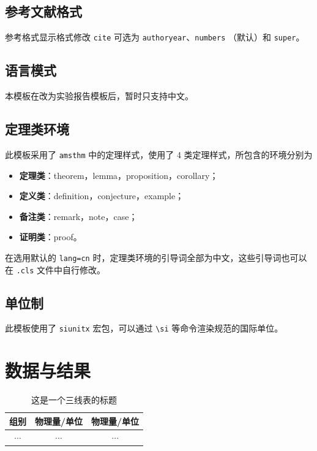 \documentclass[cn,hazy,pku,12pt,normal,math=newtx,cite=super]{elegantnote}
\begin{document}
\subsection{参考文献格式}
参考格式显示格式修改 \lstinline{cite} 可选为 \lstinline{authoryear}、\lstinline{numbers} （默认）和 \lstinline{super}。

\subsection{语言模式}

本模板在改为实验报告模板后，暂时只支持中文。


\subsection{定理类环境}

此模板采用了 \lstinline{amsthm} 中的定理样式，使用了 4 类定理样式，所包含的环境分别为
\begin{itemize}
  \item \textbf{定理类}：theorem，lemma，proposition，corollary；
  \item \textbf{定义类}：definition，conjecture，example；
  \item \textbf{备注类}：remark，note，case；
  \item \textbf{证明类}：proof。
\end{itemize}

\begin{remark}
在选用默认的 \lstinline{lang=cn} 时，定理类环境的引导词全部为中文，这些引导词也可以在 \lstinline{.cls} 文件中自行修改。
\end{remark}

\subsection{单位制}
此模板使用了 \lstinline{siunitx} 宏包，可以通过 \lstinline{\si} 等命令渲染规范的国际单位。


\section{数据与结果}

\begin{table}[htbp]
	\centering
	\small
	\caption{这是一个三线表的标题}
	\begin{tabular}{ccc}
		\toprule
		组别 &       物理量/单位       &        物理量/单位    \\
		\midrule
		$\cdots$ & $\cdots$ & $\cdots$ \\
		\bottomrule
	\end{tabular}%
	\label{tab:1}%
\end{table}%
\end{document}
